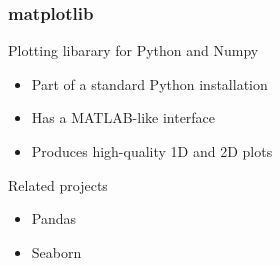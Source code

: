 \begin{frame}[fragile]
\frametitle{matplotlib}

Plotting libarary for Python and Numpy

\begin{itemize}
  \item Part of a standard Python installation
  \item Has a MATLAB-like interface
  \item Produces high-quality 1D and 2D plots
\end{itemize}

Related projects
\begin{itemize}
   \item Pandas
   \item Seaborn
\end{itemize}

\end{frame}


